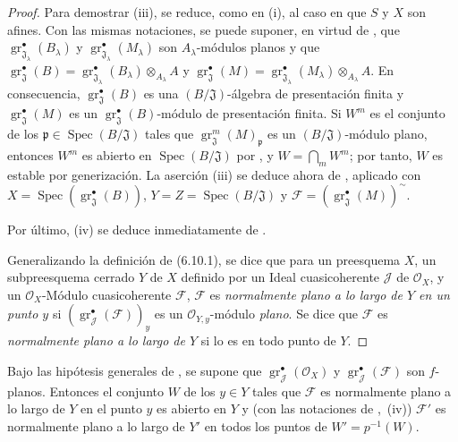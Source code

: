 \begin{proof}
Para demostrar (iii), se reduce, como en (i), al caso en que $S$ y $X$ son afines. Con las mismas notaciones, se puede suponer, en virtud de , que $\operatorname{gr}_{\mathfrak J_\lambda}^\bullet(B_\lambda)$ y $\operatorname{gr}_{\mathfrak J_\lambda}^\bullet(M_\lambda)$ son $A_\lambda$-módulos planos y que
$\operatorname{gr}_{\mathfrak J}^\bullet(B)
=\operatorname{gr}_{\mathfrak J_\lambda}^\bullet(B_\lambda)\otimes_{A_\lambda}A$
y
$\operatorname{gr}_{\mathfrak J}^\bullet(M)
=\operatorname{gr}_{\mathfrak J_\lambda}^\bullet(M_\lambda)\otimes_{A_\lambda}A$.
En consecuencia, $\operatorname{gr}_{\mathfrak J}^\bullet(B)$ es una $(B/\mathfrak J)$-álgebra de presentación finita y $\operatorname{gr}_{\mathfrak J}^\bullet(M)$ es un $\operatorname{gr}_{\mathfrak J}^\bullet(B)$-módulo de presentación finita. Si $W^m$ es el conjunto de los $\mathfrak p\in\operatorname{Spec}(B/\mathfrak J)$ tales que $\operatorname{gr}_{\mathfrak J}^m(M)_\mathfrak p$ es un $(B/\mathfrak J)$-módulo plano, entonces $W^m$ es abierto en $\operatorname{Spec}(B/\mathfrak J)$ por , y $W=\bigcap_mW^m$; por tanto, $W$ es estable por generización. La aserción (iii) se deduce ahora de , aplicado con $X=\operatorname{Spec}(\operatorname{gr}_{\mathfrak J}^\bullet(B))$, $Y=Z=\operatorname{Spec}(B/\mathfrak J)$ y $\mathcal F=(\operatorname{gr}_{\mathfrak J}^\bullet(M))^{\sim}$.

Por último, (iv) se deduce inmediatamente de .

Generalizando la definición de (6.10.1), se dice que para un preesquema $X$, un
subpreesquema cerrado $Y$ de $X$ definido por un Ideal cuasicoherente $\mathcal J$
de $\mathcal O_X$, y un $\mathcal O_X$-Módulo cuasicoherente $\mathcal F$, $\mathcal F$ es \emph{normalmente plano a lo largo de $Y$ en un punto $y$} si $(\operatorname{gr}_{\mathcal J}^\bullet(\mathcal F))_y$ es un $\mathcal O_{Y,y}$-módulo \emph{plano}. Se dice que $\mathcal F$ es \emph{normalmente plano a lo largo de $Y$} si lo es en todo punto de $Y$.
\end{proof}

\begin{corollary}[11.3.5]
\label{IV.11.3.5}
Bajo las hipótesis generales de , se supone que $\operatorname{gr}_{\mathcal J}^\bullet(\mathcal O_X)$ y $\operatorname{gr}_{\mathcal J}^\bullet(\mathcal F)$ son $f$-planos. Entonces el conjunto $W$ de los $y\in Y$ tales que $\mathcal F$ es normalmente plano a lo largo de $Y$ en el punto $y$ es abierto en $Y$ y (con las notaciones de ,~\textup{(iv))} $\mathcal F'$ es normalmente plano a lo largo de $Y'$ en todos los puntos de $W'=p^{-1}(W)$.
\end{corollary}

